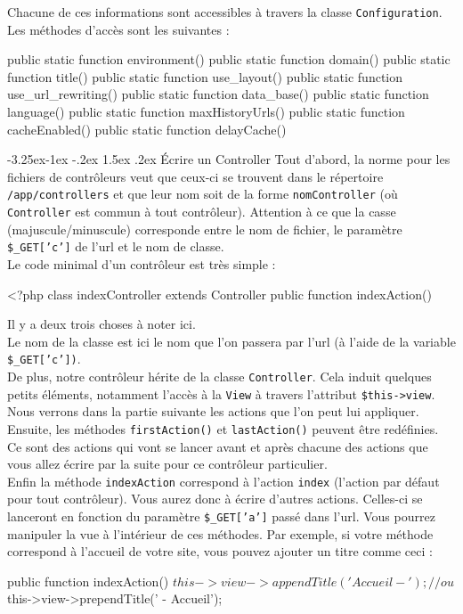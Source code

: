 \documentclass[a4paper,11pt]{article}
\makeatletter
\renewcommand{\subsection}{\@startsection{subsection}{2}{\z@}%
             {-3.25ex\@plus -1ex \@minus -.2ex}%
             {1.5ex \@plus .2ex}%
             {\color{bleuFonce}\normalfont\large\bfseries}}
\makeatother
\begin{document}
Chacune de ces informations sont accessibles à travers la classe \texttt{Configuration}. Les méthodes d'accès sont les suivantes :
\begin{PHP}
public static function environment()
public static function domain()
public static function title()
public static function use_layout()
public static function use_url_rewriting()
public static function data_base()
public static function language()
public static function maxHistoryUrls()
public static function cacheEnabled()
public static function delayCache()
\end{PHP}

\subsection{Écrire un Controller}
Tout d'abord, la norme pour les fichiers de contrôleurs veut que ceux-ci se trouvent dans le répertoire \texttt{/app/controllers} et que leur nom soit de la forme \texttt{nomController} (où \texttt{Controller} est commun à tout contrôleur). Attention à ce que la casse (majuscule/minuscule) corresponde entre le nom de fichier, le paramètre \texttt{\$\_GET['c']} de l'url et le nom de classe.\\

Le code minimal d'un contrôleur est très simple :
\begin{PHP}
<?php   
class indexController extends Controller {
  public function indexAction() {}
}
\end{PHP}

Il y a deux trois choses à noter ici.\\

Le nom de la classe est ici le nom que l'on passera par l'url (à l'aide de la variable \texttt{\$\_GET['c'])}.\\

De plus, notre contrôleur hérite de la classe \texttt{Controller}. Cela induit quelques petits éléments, notamment l'accès à la \texttt{View} à travers l'attribut \texttt{\$this->view}. Nous verrons dans la partie suivante les actions que l'on peut lui appliquer. Ensuite, les méthodes \texttt{firstAction()} et \texttt{lastAction()} peuvent être redéfinies. Ce sont des actions qui vont se lancer avant et après chacune des actions que vous allez écrire par la suite pour ce contrôleur particulier.\\

Enfin la méthode \texttt{indexAction} correspond à l'action \texttt{index} (l'action par défaut pour tout contrôleur). Vous aurez donc à écrire d'autres actions. Celles-ci se lanceront en fonction du paramètre \texttt{\$\_GET['a']} passé dans l'url. Vous pourrez manipuler la vue à l'intérieur de ces méthodes. Par exemple, si votre méthode correspond à l'accueil de votre site, vous pouvez ajouter un titre comme ceci :
\begin{PHP}
public function indexAction() {
  $this->view->appendTitle('Accueil - ');
  // ou
  $this->view->prependTitle(' - Accueil');
}
\end{PHP}
\end{document}
